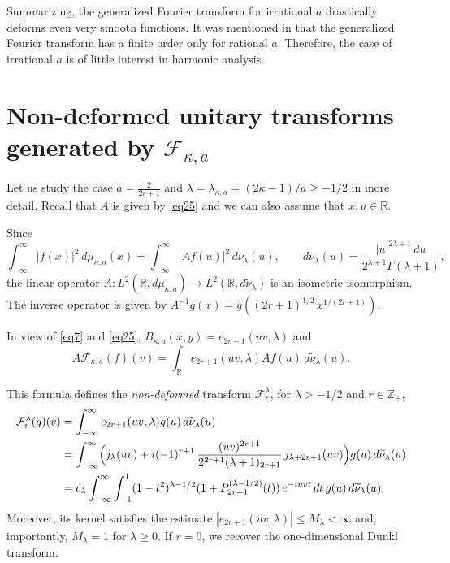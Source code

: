 \documentclass[12pt,twoside,reqno]{amsart}\usepackage[cp1251]{inputenc}
\theoremstyle{plain}
\theoremstyle{remark}
\begin{document}
Summarizing, the generalized Fourier  transform for irrational $a$  drastically  deforms even very smooth functions.
It was mentioned
in  \cite[Chap. 5]{SKO12} that the generalized Fourier  transform has a finite order only for rational $a$.
 Therefore, the case of irrational $a$ is of little  interest in harmonic analysis.



\vspace{0.6mm}

\section{Non-deformed unitary transforms generated by $\mathcal{F}_{\kappa,a}$}\label{sec6}

Let us study the case  $a=\frac{2}{2r+1}$ and  $\lambda=\lambda_{\kappa,a}=(2\kappa-1)/a\ge -1/2$ in more detail.
Recall that $A$ is given by \eqref{eq25} and
we can also assume  that $x, u\in \mathbb{R}$.

Since
\[
\int_{-\infty}^{\infty}|f(x)|^2\,d\mu_{\kappa,a}(x)=\int_{-\infty}^{\infty}|Af(u)|^2\,d\widetilde{\nu}_{\lambda}(u),\qquad
d\widetilde{\nu}_{\lambda}(u)%
=\frac{|u|^{2\lambda+1}\,du}{2^{\lambda+1} \Gamma(\lambda+1)},
\]
the linear operator $A\colon L^{2}(\mathbb{R},d\mu_{\kappa,a})\to L^{2}(\mathbb{R},d\widetilde{\nu}_{\lambda})$ is an isometric isomorphism. The inverse operator is given by
$A^{-1}g(x)=g((2r+1)^{1/2}\,x^{1/(2r+1)})$.

In view of \eqref{eq7} and \eqref{eq25}, $B_{\kappa,a}(x,y)=e_{2r+1}(uv,\lambda)$ and
\begin{equation*}
A\mathcal{F}_{\kappa,a}(f)(v)=\int_{\mathbb{R}}e_{2r+1}(uv,\lambda)Af(u)
\,d\widetilde{\nu}_{\lambda}(u).
\end{equation*}

This formula defines the \textit{non-deformed} transform $\mathcal{F}_{r}^{\lambda}$, for
 $\lambda> -1/2$ and $r\in\mathbb{Z}_+$,
\begin{align*}%
\mathcal{F}_{r}^{\lambda}(g)(v)&=\int_{-\infty}^{\infty}e_{2r+1}(uv,\lambda)g(u)
\,d\widetilde{\nu}_{\lambda}(u)\\
&=\int_{-\infty}^{\infty}\Bigl(j_{\lambda}(uv)+i(-1)^{r+1}\,\frac{(uv)^{2r+1}}{2^{2r+1}(\lambda+1)_{2r+1}}\,
j_{\lambda+2r+1}(uv)\Bigr)g(u)
\,d\widetilde{\nu}_{\lambda}(u)\\
&=c_{\lambda}\int_{-\infty}^{\infty}\int_{-1}^{1}(1-t^2)^{\lambda-1/2}(1+P_{2r+1}^{(\lambda-1/2)}(t))\,e^{-iuvt}\,dt\,g(u)
\,d\widetilde{\nu}_{\lambda}(u).
\end{align*}
Moreover, its  kernel satisfies the estimate  $|e_{2r+1}(uv,\lambda)|\le M_{\lambda}<\infty$ and, importantly,   $M_{\lambda}=1$ for $\lambda\ge0$. If $r=0$, we recover the one-dimensional Dunkl transform.
\end{document}
